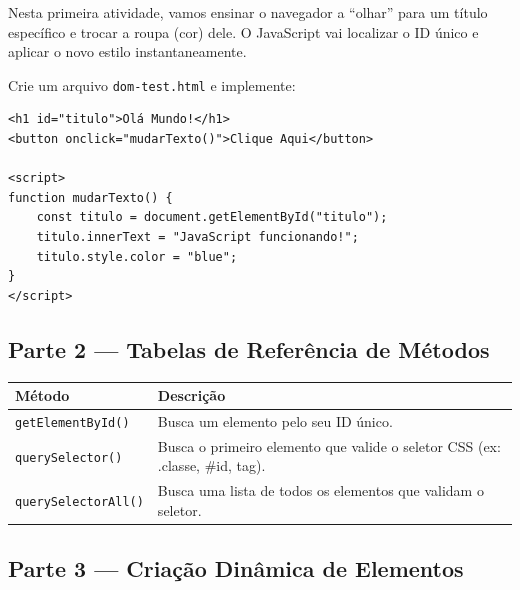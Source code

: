 \documentclass[12pt,a4paper]{article}
\begin{document}
\begin{boxAtividade}
Nesta primeira atividade, vamos ensinar o navegador a ``olhar'' para um título específico e trocar a roupa (cor) dele. O JavaScript vai localizar o ID único e aplicar o novo estilo instantaneamente.
\end{boxAtividade}

\begin{boxAtividade}
Crie um arquivo \texttt{dom-test.html} e implemente:


\begin{boxCodigo}
\begin{verbatim}
<h1 id="titulo">Olá Mundo!</h1>
<button onclick="mudarTexto()">Clique Aqui</button>

<script>
function mudarTexto() {
    const titulo = document.getElementById("titulo");
    titulo.innerText = "JavaScript funcionando!";
    titulo.style.color = "blue";
}
</script>
\end{verbatim}
\end{boxCodigo}
\end{boxAtividade}

\subsection{Parte 2 — Tabelas de Referência de Métodos}

\begin{boxAtividade}
\begin{center}
\begin{tabular}{|l|p{10cm}|}
\hline
\rowcolor{azulTitulo} \color{white} \textbf{Método} & \color{white} \textbf{Descrição} \\ \hline
\texttt{getElementById()} & Busca um elemento pelo seu ID único. \\ \hline
\texttt{querySelector()} & Busca o primeiro elemento que valide o seletor CSS (ex: .classe, \#id, tag). \\ \hline
\texttt{querySelectorAll()} & Busca uma lista de todos os elementos que validam o seletor. \\ \hline
\end{tabular}
\end{center}
\end{boxAtividade}

\subsection{Parte 3 — Criação Dinâmica de Elementos}
\end{document}
